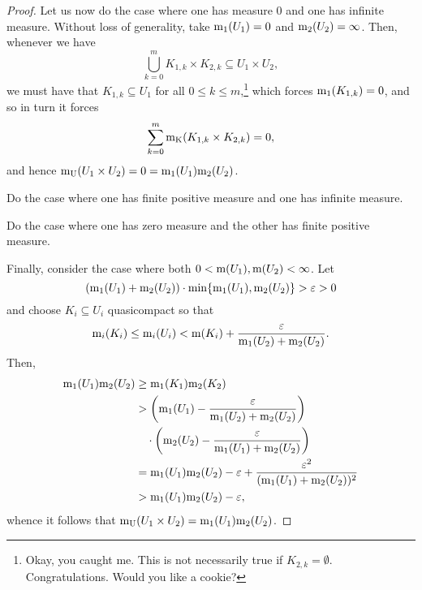 \begin{thm}
\begin{proof}
Let us now do the case where one has measure $0$ and one has infinite measure.  Without loss of generality, take $\mathrm{m} _1(U_1)=0$ and $\mathrm{m} _2(U_2)=\infty$.  Then, whenever we have
\begin{equation}
\bigcup _{k=0}^mK_{1,k}\times K_{2,k}\subseteq U_1\times U_2,
\end{equation}
we must have that $K_{1,k}\subseteq U_1$ for all $0\leq k\leq m$,\footnote{Okay, you caught me.  This is not necessarily true if $K_{2,k}=\emptyset$.  Congratulations.  Would you like a cookie?} which forces $\mathrm{m} _1(K_{1,k})=0$, and so in turn it forces
\begin{equation}
\sum _{k=0}^m\mathrm{m} _{\mathrm{K}}(K_{1,k}\times K_{2,k})=0,
\end{equation}
and hence $\mathrm{m} _{\mathrm{U}}(U_1\times U_2)=0=\mathrm{m} _1(U_1)\mathrm{m} _2(U_2)$.

\begin{exr}
Do the case where one has finite positive measure and one has infinite measure.
\end{exr}

\begin{exr}
Do the case where one has zero measure and the other has finite positive measure.
\end{exr}

Finally, consider the case where both $0<\mathrm{m} (U_1),\mathrm{m} (U_2)<\infty$.  Let
\begin{equation}
(\mathrm{m} _1(U_1)+\mathrm{m} _2(U_2))\cdot \min \{ \mathrm{m} _1(U_1),\mathrm{m} _2(U_2)\} >\varepsilon >0
\end{equation}
and choose $K_i\subseteq U_i$ quasicompact so that
\begin{equation}
\mathrm{m} _i(K_i)\leq \mathrm{m} _i(U_i)<\mathrm{m} (K_i)+\frac{\varepsilon}{\mathrm{m} _1(U_2)+\mathrm{m} _2(U_2)}.
\end{equation}
Then,
\begin{equation}
\begin{split}
\mathrm{m} _1(U_1)\mathrm{m} _2(U_2) & \geq \mathrm{m} _1(K_1)\mathrm{m} _2(K_2) \\
& >\left( \mathrm{m} _1(U_1)-\frac{\varepsilon}{\mathrm{m} _1(U_2)+\mathrm{m} _2(U_2)}\right) \\
& \quad \cdot \left( \mathrm{m} _2(U_2)-\frac{\varepsilon}{\mathrm{m} _1(U_1)+\mathrm{m} _2(U_2)}\right) \\
& =\mathrm{m} _1(U_1)\mathrm{m} _2(U_2)-\varepsilon +\frac{\varepsilon ^2}{(\mathrm{m} _1(U_1)+\mathrm{m} _2(U_2))^2} \\
& >\mathrm{m} _1(U_1)\mathrm{m} _2(U_2)-\varepsilon ,
\end{split}
\end{equation}
whence it follows that $\mathrm{m} _{\mathrm{U}}(U_1\times U_2)=\mathrm{m} _1(U_1)\mathrm{m} _2(U_2)$.


\end{proof}
\end{thm}
